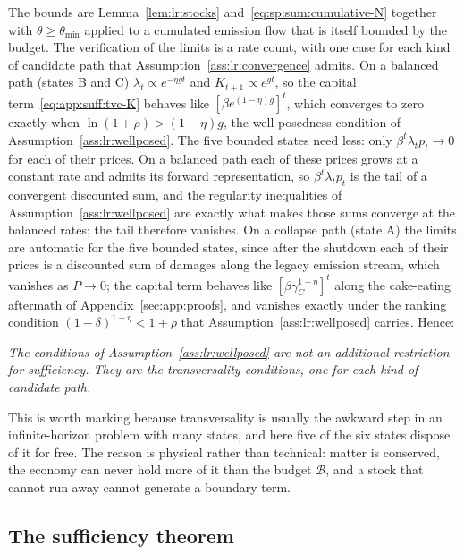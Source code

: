 The bounds are Lemma~\ref{lem:lr:stocks} and~\eqref{eq:sp:sum:cumulative-N} together with $\theta\ge\theta_{\min}$ applied to a cumulated emission flow that is itself bounded by the budget. The verification of the limits is a rate count, with one case for each kind of candidate path that Assumption~\ref{ass:lr:convergence} admits. On a balanced path (states B and C) $\lambda_t\propto e^{-\eta gt}$ and $K_{t+1}\propto e^{gt}$, so the capital term~\eqref{eq:app:suff:tvc-K} behaves like $\left[\beta e^{\left(1-\eta\right)g}\right]^t$, which converges to zero exactly when $\ln\left(1+\rho\right)>\left(1-\eta\right)g$, the well-posedness condition of Assumption~\ref{ass:lr:wellposed}. The five bounded states need less: only $\beta^t\lambda_t p_t\to0$ for each of their prices. On a balanced path each of these prices grows at a constant rate and admits its forward representation, so $\beta^t\lambda_t p_t$ is the tail of a convergent discounted sum, and the regularity inequalities of Assumption~\ref{ass:lr:wellposed} are exactly what makes those sums converge at the balanced rates; the tail therefore vanishes. On a collapse path (state A) the limits are automatic for the five bounded states, since after the shutdown each of their prices is a discounted sum of damages along the legacy emission stream, which vanishes as $P\to0$; the capital term behaves like $\left[\beta\gamma_C^{1-\eta}\right]^t$ along the cake-eating aftermath of Appendix~\ref{sec:app:proofs}, and vanishes exactly under the ranking condition $\left(1-\delta\right)^{1-\eta}<1+\rho$ that Assumption~\ref{ass:lr:wellposed} carries. Hence:

\begin{center}
\emph{The conditions of Assumption~\ref{ass:lr:wellposed} are not an additional restriction for sufficiency. They are the transversality conditions, one for each kind of candidate path.}
\end{center}

This is worth marking because transversality is usually the awkward step in an infinite-horizon problem with many states, and here five of the six states dispose of it for free. The reason is physical rather than technical: matter is conserved, the economy can never hold more of it than the budget $\mathcal B$, and a stock that cannot run away cannot generate a boundary term.

\subsection{The sufficiency theorem}\label{sec:app:suff:theorem}

